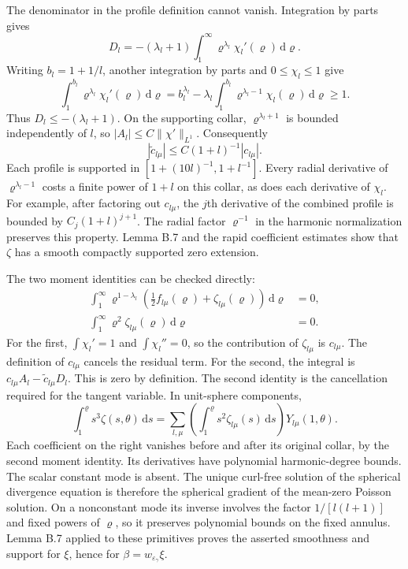 \documentclass[
  english,
  11pt,
  reqno]{amsart}
\begin{document}
The denominator in the profile definition cannot vanish. Integration by
parts gives \[
D_l=-(\lambda_l+1)
\int_1^\infty\varrho^{\lambda_l}\chi_l'(\varrho)\,\mathrm d\varrho.
\] Writing \(b_l=1+1/l\), another integration by parts and
\(0\le\chi_l\le1\) give \[
\int_1^{b_l}\varrho^{\lambda_l}\chi_l'(\varrho)\,\mathrm d\varrho
=b_l^{\lambda_l}
-\lambda_l\int_1^{b_l}
\varrho^{\lambda_l-1}\chi_l(\varrho)\,\mathrm d\varrho
\ge1.
\] Thus \(D_l\le-(\lambda_l+1)\). On the supporting collar,
\(\varrho^{\lambda_l+1}\) is bounded independently of \(l\), so
\(|A_l|\le C\|\chi'\|_{L^1}\). Consequently \[
|\widetilde c_{l\mu}|
\le C(1+l)^{-1}|c_{l\mu}|.
\] Each profile is supported in \([1+(10l)^{-1},1+l^{-1}]\). Every
radial derivative of \(\varrho^{\lambda_l-1}\) costs a finite power of
\(1+l\) on this collar, as does each derivative of \(\chi_l\). For
example, after factoring out \(c_{l\mu}\), the \(j\)th derivative of the
combined profile is bounded by \(C_j(1+l)^{j+1}\). The radial factor
\(\varrho^{-1}\) in the harmonic normalization preserves this property.
Lemma B.7 and the rapid coefficient estimates show that \(\zeta\) has a
smooth compactly supported zero extension.

The two moment identities can be checked directly:%
 \[
\begin{aligned}
\int_1^\infty\varrho^{1-\lambda_l}
\left(\frac12 f_{l\mu}(\varrho)+\zeta_{l\mu}(\varrho)\right)
\,\mathrm d\varrho&=0,\\
\int_1^\infty\varrho^2\zeta_{l\mu}(\varrho)\,\mathrm d\varrho&=0.
\end{aligned}
\] For the first, \(\int\chi_l'=1\) and \(\int\chi_l''=0\), so the
contribution of \(\zeta_{l\mu}\) is \(c_{l\mu}\). The definition of
\(c_{l\mu}\) cancels the residual term. For the second, the integral is
\(c_{l\mu}A_l-\widetilde c_{l\mu}D_l\). This is zero by definition. The
second identity is the cancellation required for the tangent variable.
In unit-sphere components, \[
\int_1^\varrho s^3\zeta(s,\theta)\,\mathrm ds
=\sum_{l,\mu}
\left(\int_1^\varrho s^2\zeta_{l\mu}(s)\,\mathrm ds\right)
Y_{l\mu}(1,\theta).
\] Each coefficient on the right vanishes before and after its original
collar, by the second moment identity. Its derivatives have polynomial
harmonic-degree bounds. The scalar constant mode is absent. The unique
curl-free solution of the spherical divergence equation is therefore the
spherical gradient of the mean-zero Poisson solution. On a nonconstant
mode its inverse involves the factor \(1/[l(l+1)]\) and fixed powers of
\(\varrho\), so it preserves polynomial bounds on the fixed annulus.
Lemma B.7 applied to these primitives proves the asserted smoothness and
support for \(\xi\), hence for \(\beta=w_{\varepsilon_\gamma}\xi\).
\end{document}
